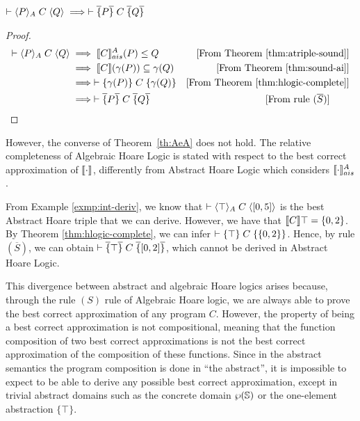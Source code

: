 \documentclass[
  10pt,       %
  twoside,    %
  a4paper,    %
  english,    %
  tikz,       %
  openright,  %
]{book}
\begin{document}
\begin{theorem} \label{th:AeA}
  $\vdash \langle P \rangle_{A} \; C \; \langle Q \rangle \implies \vdash \overline{\{} P \overline{\}} \; C \; \overline{\{} Q \overline{\}}$
\end{theorem}
\begin{proof}
  \begin{align*}
    \vdash \langle P \rangle_{A} \; C \; \langle Q \rangle
      &\implies \llbracket C \rrbracket_{ais}^{A}(P) \leq Q
      &\text{[From Theorem \ref{thm:atriple-sound}]} \\
      &\implies \llbracket C \rrbracket(\gamma(P)) \subseteq \gamma(Q)
      &\text{[From Theorem \ref{thm:sound-ai}]} \\
      &\implies \vdash \{ \gamma(P) \} \; C \; \{ \gamma(Q) \}
      &\text{[From Theorem \ref{thm:hlogic-complete}]} \\
      &\implies \vdash \overline{\{} P \overline{\}} \; C \; \overline{\{} Q \overline{\}}
      &\text{[From rule $(\overline{S})$]} \tag*{\qedhere}
  \end{align*}
\end{proof}

However, the converse of Theorem~\ref{th:AeA} does not hold. The relative completeness of Algebraic Hoare
Logic is stated with respect to the best correct approximation of $\llbracket \cdot \rrbracket$, differently from 
Abstract Hoare Logic which considers $\llbracket \cdot \rrbracket_{ais}^{A}$.

\begin{example}
  From Example \ref{exmp:int-deriv}, we know that $\vdash \langle \top \rangle_{A} \; C \; \langle [0, 5] \rangle$ is
  the best Abstract Hoare triple that we can derive. However, we have that $\llbracket C \rrbracket{\top} = \{0,
  2\}$. By Theorem \ref{thm:hlogic-complete}, we can infer
  $\vdash \{ \top \} \; C \; \{ \{0, 2\} \}$. Hence, by rule $(\overline{S})$, we can
  obtain $\vdash \overline{\{} \top \overline{\}} \; C \; \overline{\{} [0, 2] \overline{\}}$, which cannot be derived in Abstract Hoare
  Logic.
\end{example}

This divergence  between abstract and 
algebraic Hoare logics arises because, through the rule $(S)$ rule of Algebraic Hoare logic,
we are always able to prove the best correct approximation of any program $C$. However, the 
property of being a best correct approximation is not compositional, 
meaning that the function composition of two best correct approximations is not
the best correct approximation of the composition of these functions. Since in the
abstract semantics the program composition is done in ``the abstract'', it is
impossible to expect to be able to derive any possible best correct
approximation, except in trivial abstract domains such as the concrete domain
$\wp(\mathbb{S})$ or the  one-element abstraction $\{\top\}$.
\end{document}
